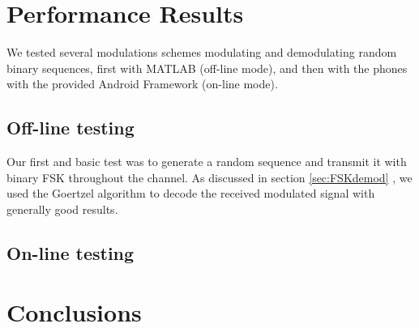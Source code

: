 \documentclass[12pt,a4paper,openright]{article}
\begin{document}
\section{Performance Results}
We tested several modulations schemes modulating and demodulating random binary sequences, first with MATLAB (off-line mode), and then with the phones with the provided Android Framework (on-line mode). 
\subsection{Off-line testing}
Our first and basic test was to generate a random sequence and transmit it with binary FSK throughout the channel. As discussed in section \ref{sec:FSKdemod} , we used the Goertzel algorithm to decode the received modulated signal with generally good results.
 

\subsection{On-line testing}
\clearpage


\section{Conclusions}
\end{document}
